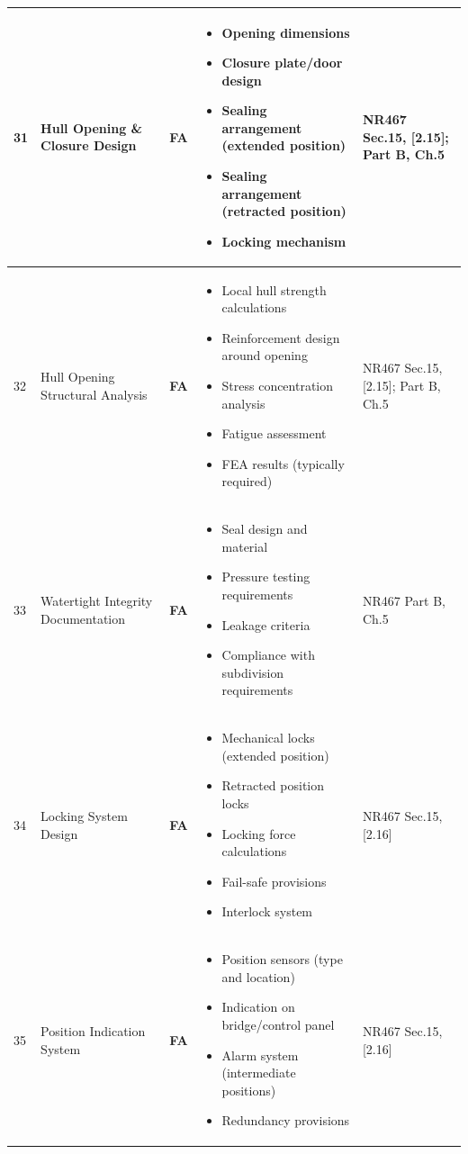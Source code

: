 \documentclass[11pt,a4paper]{report}
\newcommand{\fa}{\textbf{\textcolor{warningred}{FA}}}
\begin{document}
\begin{longtable}{|p{0.5cm}|p{5cm}|p{1.5cm}|p{5.5cm}|p{2cm}|}
31 & Hull Opening \& Closure Design & \fa{} & 
\begin{itemize}[leftmargin=*,nosep]
\item Opening dimensions
\item Closure plate/door design
\item Sealing arrangement (extended position)
\item Sealing arrangement (retracted position)
\item Locking mechanism
\end{itemize} & NR467 Sec.15, [2.15]; Part B, Ch.5 \\
\hline

32 & Hull Opening Structural Analysis & \fa{} & 
\begin{itemize}[leftmargin=*,nosep]
\item Local hull strength calculations
\item Reinforcement design around opening
\item Stress concentration analysis
\item Fatigue assessment
\item FEA results (typically required)
\end{itemize} & NR467 Sec.15, [2.15]; Part B, Ch.5 \\
\hline

33 & Watertight Integrity Documentation & \fa{} & 
\begin{itemize}[leftmargin=*,nosep]
\item Seal design and material
\item Pressure testing requirements
\item Leakage criteria
\item Compliance with subdivision requirements
\end{itemize} & NR467 Part B, Ch.5 \\
\hline

34 & Locking System Design & \fa{} & 
\begin{itemize}[leftmargin=*,nosep]
\item Mechanical locks (extended position)
\item Retracted position locks
\item Locking force calculations
\item Fail-safe provisions
\item Interlock system
\end{itemize} & NR467 Sec.15, [2.16] \\
\hline

35 & Position Indication System & \fa{} & 
\begin{itemize}[leftmargin=*,nosep]
\item Position sensors (type and location)
\item Indication on bridge/control panel
\item Alarm system (intermediate positions)
\item Redundancy provisions
\end{itemize} & NR467 Sec.15, [2.16] \\
\hline


\end{longtable}
\end{document}
